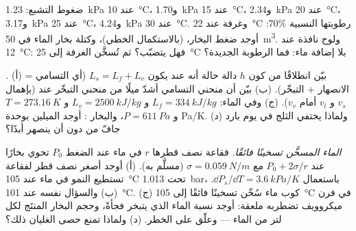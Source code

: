 \begin{exercise}[$\star\star$]\label{exo:b1:phase-changes:9}
ضغوط التشبع: \qty{1.23}{kPa} عند \qty{10}{\degreeCelsius}، و\qty{1.70}{kPa}
عند \qty{15}{\degreeCelsius}، و\qty{2.34}{kPa} عند \qty{20}{\degreeCelsius}، و\qty{3.17}{kPa}
عند \qty{25}{\degreeCelsius}، و\qty{4.24}{kPa} عند \qty{30}{\degreeCelsius}. وغرفة
عند \qty{22}{\degreeCelsius} رطوبتها النسبية $70\%$: أوجد ضغط
البخار،  (بالاستكمال الخطي)، وكتلة بخار الماء في
\qty{50}{m^3}. ولوح نافذة عند \qty{12}{\degreeCelsius}: فهل يتضبّب؟
ثم تُسخَّن الغرفة إلى \qty{25}{\degreeCelsius} بلا إضافة ماء: فما
الرطوبة الجديدة؟
\end{exercise}

\begin{exercise}[$\star\star\star$]\label{exo:b1:phase-changes:10}
\emph{.} (أ) بيّن انطلاقًا من كون $h$ دالة حالة
أنه عند  يكون $L_s = L_f + L_v$ (أي التسامي = الانصهار +
التبخّر). (ب) بيّن  أن منحني التسامي
أشدّ ميلًا من منحني التبخّر عند 
(بإهمال $v_s$ و $v_l$ أمام $v_v$). (ج) وفي الماء: $L_f = \qty{334}{kJ/kg}$
و $L_v = \qty{2500}{kJ/kg}$ و $T = \qty{273.16}{K}$ و $P = \qty{611}{Pa}$، والبخار
: أوجد الميلين بوحدة \unit{Pa/K}. (د) ولماذا يختفي الثلج
في يوم بارد جافّ من دون أن ينصهر أبدًا؟
\end{exercise}

\begin{exercise}[$\star\star\star$]\label{exo:b1:phase-changes:11}
\emph{الماء المسخَّن تسخينًا فائقًا.} فقاعة نصف قطرها $r$ في ماء عند الضغط
$P_0$ تحوي بخارًا عند $P_0 + 2\sigma/r$ مع $\sigma = \qty{0.059}{N/m}$
(مسلَّم به). (أ) أوجد أصغر نصف قطر لفقاعة تستطيع النمو في ماء عند
\qty{105}{\degreeCelsius} تحت \qty{1.013}{bar}، باستعمال
$\dd P_s/\dd T = \qty{3.6}{kPa/K}$. (ب) والسؤال نفسه عند \qty{101}{\degreeCelsius}.
(ج) كوب ماء سُخّن تسخينًا فائقًا إلى \qty{105}{\degreeCelsius} في فرن
ميكروويف تضطربه ملعقة: أوجد نسبة الماء الذي يتبخر فجأةً،
وحجم البخار المنتَج لكل لتر من الماء --- وعلّق
على الخطر. (د) ولماذا تمنع حصى الغليان ذلك؟
\end{exercise}

